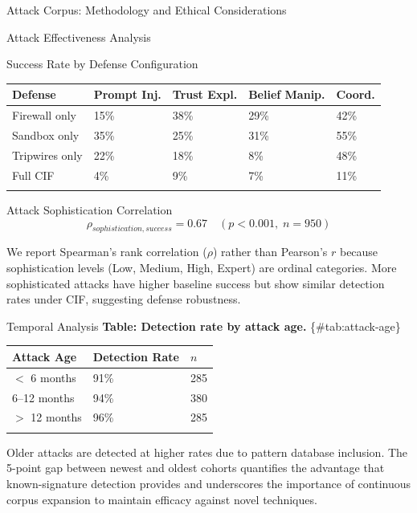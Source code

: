 \documentclass[
  ignorenonframetext,
]{beamer}
\newcounter{none} %
\begin{document}
\begin{frame}{Attack Corpus: Methodology and Ethical Considerations}
\begin{block}{Attack Effectiveness Analysis}
\begin{block}{Success Rate by Defense Configuration}
{\def\LTcaptype{none} %
\begin{longtable}[]{@{}lllll@{}}
\toprule\noalign{}
Defense & Prompt Inj. & Trust Expl. & Belief Manip. & Coord. \\
\midrule\noalign{}
\endhead
Firewall only & 15\% & 38\% & 29\% & 42\% \\
Sandbox only & 35\% & 25\% & 31\% & 55\% \\
Tripwires only & 22\% & 18\% & 8\% & 48\% \\
Full CIF & 4\% & 9\% & 7\% & 11\% \\
\bottomrule\noalign{}
\end{longtable}
}
\end{block}

\begin{block}{Attack Sophistication Correlation}
\protect{}\label{sec:sophistication-corr}
\begin{equation}
\label{eq:sophistication-correlation}
\rho_{sophistication, success} = 0.67 \quad (p < 0.001, \; n = 950)
\end{equation}

We report Spearman's rank correlation (\(\rho\)) rather than Pearson's
\(r\) because sophistication levels (Low, Medium, High, Expert) are
ordinal categories. More sophisticated attacks have higher baseline
success but show similar detection rates under CIF, suggesting defense
robustness.
\end{block}

\begin{block}{Temporal Analysis}
\protect{}\label{sec:temporal-analysis}
\textbf{Table: Detection rate by attack age.} \{\#tab:attack-age\}

{\def\LTcaptype{none} %
\begin{longtable}[]{@{}lll@{}}
\toprule\noalign{}
Attack Age & Detection Rate & \(n\) \\
\midrule\noalign{}
\endhead
\(<\) 6 months & 91\% & 285 \\
6--12 months & 94\% & 380 \\
\(>\) 12 months & 96\% & 285 \\
\bottomrule\noalign{}
\end{longtable}
}

Older attacks are detected at higher rates due to pattern database
inclusion. The 5-point gap between newest and oldest cohorts quantifies
the advantage that known-signature detection provides and underscores
the importance of continuous corpus expansion to maintain efficacy
against novel techniques.
\end{block}
\end{block}


\end{frame}
\end{document}

